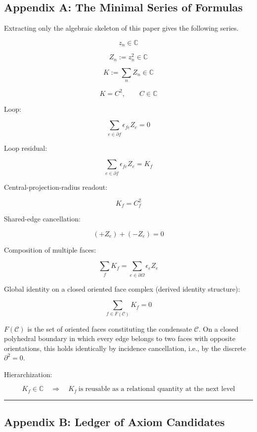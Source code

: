 \documentclass[
  a4paper,
]{article}
\begin{document}
\subsection{Appendix A: The Minimal Series of
Formulas}\label{appendix-a-the-minimal-series-of-formulas}

Extracting only the algebraic skeleton of this paper gives the following
series.

\[
z_n\in\mathbb C
\]

\[
Z_n:=z_n^2\in\mathbb C
\]

\[
K:=\sum_n Z_n\in\mathbb C
\]

\[
K=C^2,\qquad C\in\mathbb C
\]

Loop:

\[
\sum_{e\in\partial f}\epsilon_{fe}Z_e=0
\]

Loop residual:

\[
\sum_{e\in\partial f}\epsilon_{fe}Z_e=K_f
\]

Central-projection-radius readout:

\[
K_f=C_f^2
\]

Shared-edge cancellation:

\[
(+Z_e)+(-Z_e)=0
\]

Composition of multiple faces:

\[
\sum_f K_f=\sum_{e\in\partial\Omega}\epsilon_e Z_e
\]

Global identity on a closed oriented face complex (derived identity
structure):

\[
\boxed{\sum_{f\in F(\mathcal C)}K_f=0}
\]

\(F(\mathcal C)\) is the set of oriented faces constituting the
condensate \(\mathcal C\). On a closed polyhedral boundary in which
every edge belongs to two faces with opposite orientations, this holds
identically by incidence cancellation, i.e., by the discrete
\(\partial^2=0\).

Hierarchization:

\[
K_f\in\mathbb C\quad\Rightarrow\quad K_f\ \text{is reusable as a relational quantity at the next level}
\]

\begin{center}\rule{0.5\linewidth}{0.5pt}\end{center}

\subsection{Appendix B: Ledger of Axiom
Candidates}\label{appendix-b-ledger-of-axiom-candidates}
\end{document}
